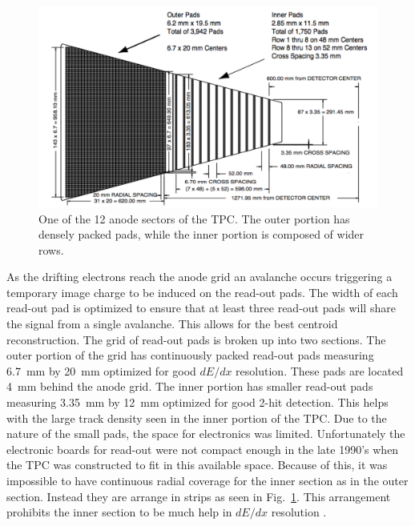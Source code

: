 \documentclass[letterpaper, abstract = on,listof=totoc, bibliography=totoc]{scrreprt}
\begin{document}
\begin{figure}
\begin{center}
\includegraphics[width = 1\textwidth]{tpcPAD}
\caption[Anode sector of STAR TPC]{One of the 12 anode sectors of the TPC. The outer portion has densely packed pads, while the inner portion is composed of wider rows.}
\label{fig:tpcPad}
\end{center}
\end{figure}
As the drifting electrons reach the anode grid an avalanche occurs triggering a temporary image charge to be induced on the read-out pads. The width of each read-out pad is optimized to ensure that at least three read-out pads will share the signal from a single avalanche. This allows for the best centroid reconstruction. The grid of read-out pads is broken up into two sections. The outer portion of the grid has continuously packed read-out pads measuring 6.7~mm by 20~mm optimized for good $dE/dx$ resolution. These pads are located 4~mm behind the anode grid. The inner portion has smaller read-out pads measuring 3.35~mm by 12~mm optimized for good 2-hit detection. This helps with the large track density seen in the inner portion of the TPC. Due to the nature of the small pads, the space for electronics was limited. Unfortunately the electronic boards for read-out were not compact enough in the late 1990's when the TPC was constructed to fit in this available space. Because of this, it was impossible to have continuous radial coverage for the inner section as in the outer section. Instead they are arrange in strips as seen in Fig.~\ref{fig:tpcPad}. This arrangement prohibits the inner section to be much help in $dE/dx$ resolution \cite{TPC}.
\end{document}
